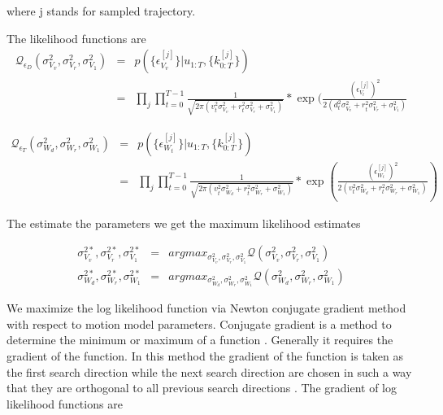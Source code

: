\documentclass[12pt]{dalcsthesis}
\begin{document}
where j stands for sampled trajectory.

The likelihood functions are 
\begin{eqnarray}
\mathcal{Q}_{\epsilon_{D}}(\sigma_{V_{v}}^{2},\sigma_{V_{r}}^{2},\sigma_{V_{1}}^{2}) & = & p(\{\epsilon_{V_{v}}^{[j]}\}|u_{1:T},\{k_{0:T}^{[j]}\})\\
 & = & \prod_{j}\prod_{t=0}^{T-1}\frac{1}{\sqrt{2\pi(v_{t}^{2}\sigma_{V_{v}}^{2}+r_{t}^{2}\sigma_{V_{r}}^{2}+\sigma_{V_{1}}^{2})}}*\exp(\frac{(\epsilon_{V_{t}}^{[j]})^{2}}{2(d_{t}^{2}\sigma_{V_{v}}^{2}+r_{t}^{2}\sigma_{V_{r}}^{2}+\sigma_{V_{1}}^{2})}
\end{eqnarray}



\begin{eqnarray*}
\mathcal{Q}_{\epsilon_{T}}(\sigma_{W_{d}}^{2},\sigma_{W_{r}}^{2},\sigma_{W_{1}}^{2}) & = & p(\{\epsilon_{W_{t}}^{[j]}\}|u_{1:T},\{k_{0:T}^{[j]}\})\\
 & = & \prod_{j}\prod_{t=0}^{T-1}\frac{1}{\sqrt{2\pi(v_{t}^{2}\sigma_{W_{d}}^{2}+r_{t}^{2}\sigma_{W_{r}}^{2}+\sigma_{W_{1}}^{2})}}*\exp(\frac{(\epsilon_{W_{t}}^{[j]})^{2}}{2(v_{t}^{2}\sigma_{W_{d}}^{2}+r_{t}^{2}\sigma_{W_{r}}^{2}+\sigma_{W_{1}}^{2})})
\end{eqnarray*}


The estimate the parameters we get the maximum likelihood estimates 

\begin{eqnarray}
\sigma_{V_{v}}^{2*},\sigma_{V_{r}}^{2*},\sigma_{V_{1}}^{2*} & = & argmax_{\sigma_{V_{v}}^{2},\sigma_{V_{r}}^{2},\sigma_{V_{1}}^{2}}\mathcal{Q}(\sigma_{V_{v}}^{2},\sigma_{V_{r}}^{2},\sigma_{V_{1}}^{2})\\
\sigma_{W_{d}}^{2*},\sigma_{W_{r}}^{2*},\sigma_{W_{1}}^{2*} & = & argmax_{\sigma_{W_{d}}^{2},\sigma_{W_{r}}^{2},\sigma_{W_{1}}^{2}}\mathcal{Q}(\sigma_{W_{d}}^{2},\sigma_{W_{r}}^{2},\sigma_{W_{1}}^{2})
\end{eqnarray}

We maximize the log likelihood function via Newton conjugate gradient method with respect to motion model parameters. Conjugate gradient is a method to determine the minimum or maximum of a function \cite{shewchuk1994introduction}. Generally it requires the gradient of the function. In this method the gradient of the function is taken as the first search direction while the next search direction are chosen in such a way that they are orthogonal to all previous search directions \cite{shewchuk1994introduction}. The gradient of log likelihood functions are 
\end{document}
